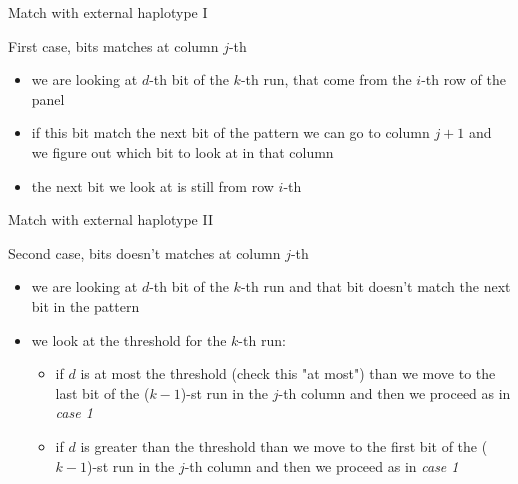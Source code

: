 \documentclass{beamer}
\begin{document}
\begin{frame}{Match with external haplotype I}
  \begin{block}{First case, bits matches at column $j$-th}
    \begin{itemize}
      \item we are looking at $d$-th bit of the $k$-th run, that come from the
      $i$-th row of the panel 
      \item if this bit match the next bit of the pattern we can go to column
      $j+1$ and we figure out which bit to look at in that column 
      \item the next bit we look at is still from row $i$-th
    \end{itemize}
  \end{block}
\end{frame}
\begin{frame}{Match with external haplotype II}
  \begin{block}{Second case, bits doesn't matches at column $j$-th}
    \begin{itemize}
      \item we are looking at $d$-th bit of the $k$-th run and that bit
      doesn't match the next bit in the pattern 
      \item we look at the threshold for the $k$-th run:
      \begin{itemize}
        \item if $d$ is at most the threshold (check this "at most") than we
        move to the last bit of the ($k-1$)-st run in the $j$-th column and
        then we proceed as in \textit{case 1}  
        \item if $d$ is greater than the threshold than we move to the first
        bit of the ($k-1$)-st run in the $j$-th column and then we proceed
        as in \textit{case 1}  
      \end{itemize}
    \end{itemize}
  \end{block}
\end{frame}
\end{document}
